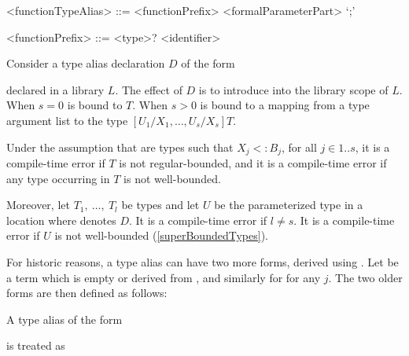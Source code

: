 \documentclass[makeidx]{article}
\begin{document}
{\begin{grammar}
<functionTypeAlias> ::= <functionPrefix> <formalParameterPart> `;'

<functionPrefix> ::= <type>? <identifier>
\end{grammar}

\LMHash{}%
Consider a type alias declaration $D$ of the form

\noindent
{}

\noindent
declared in a library $L$.
The effect of $D$ is to introduce \id{} into the library scope of $L$.
When $s = 0$
\id{} is bound to $T$.
When $s > 0$
\id{} is bound to a mapping from a type argument list
to the type
$[U_1/X_1, \ldots, U_s/X_s]T$.

\LMHash{}%
Under the assumption that  are types such that
$X_j <: B_j$, for all $j \in 1 .. s$,
it is a compile-time error if $T$ is not regular-bounded,
and it is a compile-time error if any type occurring in $T$ is not well-bounded.


\LMHash{}%
Moreover,
let $T_1,\ \ldots,\ T_l$ be types
and let $U$ be the parameterized type 
in a location where \id{} denotes $D$.
It is a compile-time error if $l \not= s$.
It is a compile-time error if $U$ is not well-bounded
(\ref{superBoundedTypes}).

\LMHash{}%
For historic reasons, a type alias can have two more forms,
derived using .
Let  be a term which is empty or derived from ,
and similarly for  for any $j$.
The two older forms are then defined as follows:

\LMHash{}%
A type alias of the form

\noindent
{}

\noindent
{}

\noindent
is treated as

\noindent
\code{\TYPEDEF{} \id<\TypeParametersStd> =}

}
\end{document}
